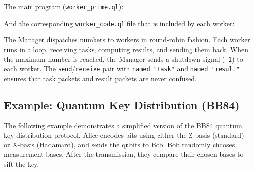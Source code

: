 The main program (\texttt{worker\_prime.ql}):



And the corresponding \texttt{worker\_code.ql} file that is included by each worker:



The Manager dispatches numbers to workers in round-robin fashion. Each worker
runs in a loop, receiving tasks, computing results, and sending them back.
When the maximum number is reached, the Manager sends a shutdown signal
(\texttt{-1}) to each worker. The \texttt{send}/\texttt{receive} pair with
\texttt{named "task"} and \texttt{named "result"} ensures that task packets
and result packets are never confused.

\subsection{Example: Quantum Key Distribution (BB84)}
\label{sec:bb84-example}
The following example demonstrates a simplified version of the BB84 quantum key distribution protocol. Alice encodes bits using either the Z-basis (standard) or X-basis (Hadamard), and sends the qubits to Bob. Bob randomly chooses measurement bases. After the transmission, they compare their chosen bases to sift the key.

